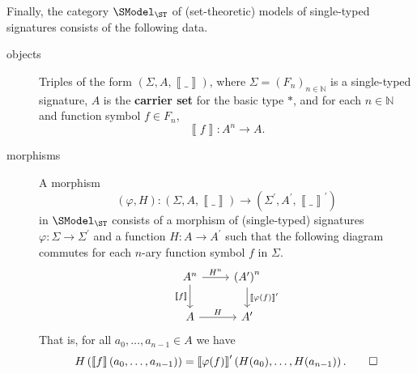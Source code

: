 \begin{solution}
Finally, the category \(\SModel_{\ST}\) of (set-theoretic) models of single-typed signatures consists of the following data.
\begin{description}
\item[objects]
Triples of the form \(\left(\Sigma, A, \left\llbracket\_\right\rrbracket\right)\), where \(\Sigma = \left(F_n\right)_{n \in \mathbb{N}}\) is a single-typed signature, \(A\) is the \textbf{carrier set} for the basic type \(*\), and for each \(n \in \mathbb{N}\) and function symbol \(f \in F_n\),
\begin{equation*}
\left\llbracket f \right\rrbracket : A^n \to A.
\end{equation*}
\item[morphisms]
A morphism
\begin{equation*}
\left(\varphi, H\right) : \left(\Sigma, A, \left\llbracket\_\right\rrbracket\right) \to \left(\Sigma^\prime, A^\prime, \left\llbracket\_\right\rrbracket^\prime\right)
\end{equation*}
in \(\SModel_{\ST}\) consists of a morphism of (single-typed) signatures \(\varphi : \Sigma \to \Sigma^\prime\) and a function \(H : A \to A^\prime\) such that the following diagram commutes for each \(n\)-ary function symbol \(f\) in \(\Sigma\).
\begin{equation*}
\begin{tikzcd}
A^n \arrow[r, "H^n"] \arrow[d, "\left\llbracket f\right\rrbracket"{left}]
& \left(A^\prime\right)^n \arrow[d, "\left\llbracket \varphi(f)\right\rrbracket^\prime"{right}] \\
A \arrow[r, "H"] & A^\prime
\end{tikzcd}
\end{equation*}
That is, for all \(a_0, \ldots, a_{n-1} \in A\) we have
\begin{equation*}
H\left(\left\llbracket f\right\rrbracket\left(a_0, \ldots, a_{n-1}\right)\right)
= \left\llbracket\varphi(f)\right\rrbracket^\prime\left(H(a_0), \ldots, H(a_{n-1})\right).
\qedhere
\end{equation*}
\end{description}
\end{solution}